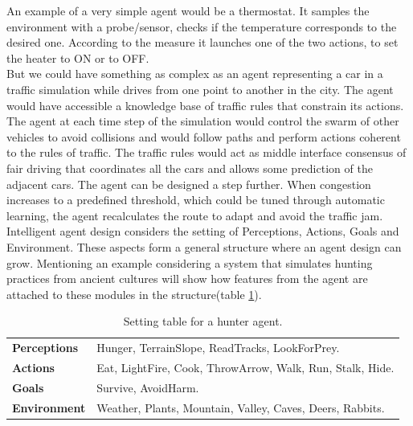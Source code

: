 \documentclass[11pt,oneside,a4paper,openright]{report}
\begin{document}
An example of a very simple agent would be a thermostat. It samples the environment with a probe/sensor, 
checks if the temperature corresponds to the desired one. According to the measure it launches one of the two 
actions, to set the heater to ON or to OFF.\\
But we could have something as complex as an agent representing a car in a traffic simulation while drives 
from one point to another in the city. The agent would have accessible a knowledge base of traffic rules 
that constrain its actions. The agent at each time step of the simulation would control the swarm of other 
vehicles to avoid collisions and would follow paths and perform actions coherent to the rules of traffic. 
The traffic rules would act as middle interface consensus of fair driving that coordinates all the cars 
and allows some prediction of the adjacent cars. The agent can be designed a step further. When congestion 
increases to a predefined threshold, which could be tuned through automatic learning, the agent recalculates 
the route to adapt and avoid the traffic jam.\\
Intelligent agent design considers the setting of Perceptions, Actions, Goals and Environment. These
aspects form a general structure where an agent design can grow. Mentioning an example considering a 
system that simulates hunting practices from ancient cultures will show how features from the agent are 
attached to these modules in the structure(table \ref{tab:hunterAgentSetting}).\\
	\begin{table}[h]
	\centering
	\begin{tabular}{|l||l|}
		\hline
		\textbf{Perceptions} & Hunger, TerrainSlope, ReadTracks, LookForPrey.\\
		\textbf{Actions} & Eat, LightFire, Cook, ThrowArrow, Walk, Run, Stalk, Hide.\\
		\textbf{Goals} & Survive, AvoidHarm.\\
		\textbf{Environment} & Weather, Plants, Mountain, Valley, Caves, Deers, Rabbits.\\ 
		\hline
	\end{tabular}
	\caption{Setting table for a hunter agent.}
	\label{tab:hunterAgentSetting}
	\end{table}

\end{document}
